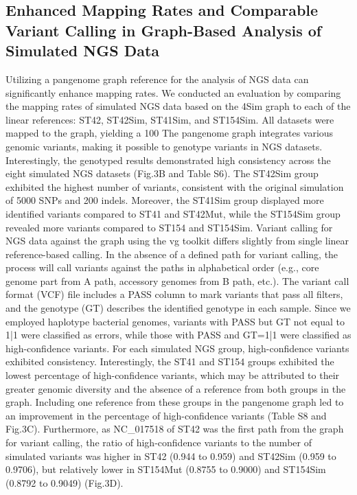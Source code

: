\subsection{Enhanced Mapping Rates and Comparable Variant Calling in Graph-Based Analysis of Simulated NGS Data}
Utilizing a pangenome graph reference for the analysis of NGS data can significantly enhance mapping rates. We conducted an evaluation by comparing the mapping rates of simulated NGS data based on the 4Sim graph to each of the linear references: ST42, ST42Sim, ST41Sim, and ST154Sim. All datasets were mapped to the graph, yielding a 100%
The pangenome graph integrates various genomic variants, making it possible to genotype variants in NGS datasets. Interestingly, the genotyped results demonstrated high consistency across the eight simulated NGS datasets (Fig.3B and Table S6). The ST42Sim group exhibited the highest number of variants, consistent with the original simulation of 5000 SNPs and 200 indels. Moreover, the ST41Sim group displayed more identified variants compared to ST41 and ST42Mut, while the ST154Sim group revealed more variants compared to ST154 and ST154Sim.
Variant calling for NGS data against the graph using the vg toolkit differs slightly from single linear reference-based calling. In the absence of a defined path for variant calling, the process will call variants against the paths in alphabetical order (e.g., core genome part from A path, accessory genomes from B path, etc.). The variant call format (VCF) file includes a PASS column to mark variants that pass all filters, and the genotype (GT) describes the identified genotype in each sample. Since we employed haplotype bacterial genomes, variants with PASS but GT not equal to 1|1 were classified as errors, while those with PASS and GT=1|1 were classified as high-confidence variants. For each simulated NGS group, high-confidence variants exhibited consistency. Interestingly, the ST41 and ST154 groups exhibited the lowest percentage of high-confidence variants, which may be attributed to their greater genomic diversity and the absence of a reference from both groups in the graph. Including one reference from these groups in the pangenome graph led to an improvement in the percentage of high-confidence variants (Table S8 and Fig.3C). Furthermore, as NC_017518 of ST42 was the first path from the graph for variant calling, the ratio of high-confidence variants to the number of simulated variants was higher in ST42 (0.944 to 0.959) and ST42Sim (0.959 to 0.9706), but relatively lower in ST154Mut (0.8755 to 0.9000) and ST154Sim (0.8792 to 0.9049) (Fig.3D).
